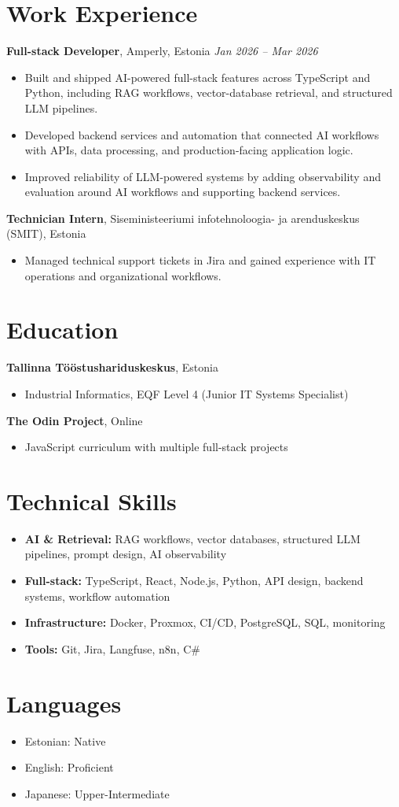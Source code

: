 \documentclass[a4paper,10pt]{article}
\begin{document}
\section{\faBriefcase\quad Work Experience}
\textbf{Full-stack Developer}, Amperly, Estonia \hfill \textit{Jan 2026 -- Mar 2026}
\begin{itemize}
    \item Built and shipped AI-powered full-stack features across TypeScript and Python, including RAG workflows, vector-database retrieval, and structured LLM pipelines.
    \item Developed backend services and automation that connected AI workflows with APIs, data processing, and production-facing application logic.
    \item Improved reliability of LLM-powered systems by adding observability and evaluation around AI workflows and supporting backend services.
\end{itemize}
\textbf{Technician Intern}, Siseministeeriumi infotehnoloogia- ja arenduskeskus (SMIT), Estonia
\begin{itemize}
    \item Managed technical support tickets in Jira and gained experience with IT operations and organizational workflows.
\end{itemize}

\section{\faGraduationCap\quad Education}
\textbf{Tallinna Tööstushariduskeskus}, Estonia
\begin{itemize}
    \item Industrial Informatics, EQF Level 4 (Junior IT Systems Specialist)
\end{itemize}
\textbf{The Odin Project}, Online
\begin{itemize}
    \item JavaScript curriculum with multiple full-stack projects
\end{itemize}

\section{\faCode\quad Technical Skills}
\begin{itemize}
    \item \textbf{AI \& Retrieval:} RAG workflows, vector databases, structured LLM pipelines, prompt design, AI observability
    \item \textbf{Full-stack:} TypeScript, React, Node.js, Python, API design, backend systems, workflow automation
    \item \textbf{Infrastructure:} Docker, Proxmox, CI/CD, PostgreSQL, SQL, monitoring
    \item \textbf{Tools:} Git, Jira, Langfuse, n8n, C\#
\end{itemize}

\section{\faGlobe\quad Languages}
\begin{itemize}
    \item Estonian: Native
    \item English: Proficient
    \item Japanese: Upper-Intermediate
\end{itemize}
\end{document}
